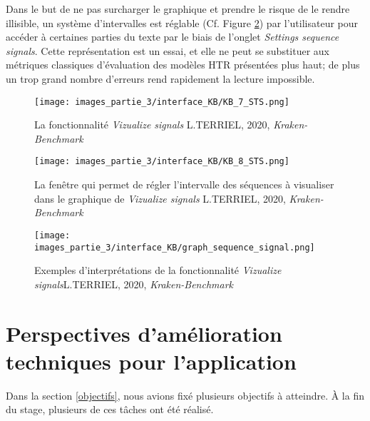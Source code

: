 Dans le but de ne pas surcharger le graphique et prendre le risque de le rendre illisible, un système d'intervalles est réglable (Cf. Figure \ref{fig:accueil_KB_6}) par l'utilisateur pour accéder à certaines parties du texte par le biais de l'onglet \textit{Settings sequence signals}. Cette représentation est un essai, et elle ne peut se substituer aux métriques classiques d'évaluation des modèles HTR présentées plus haut; de plus un trop grand nombre d'erreurs rend rapidement la lecture impossible.
\begin{figure}[H]
    \centering
    \texttt{[image: images\_partie\_3/interface\_KB/KB\_7\_STS.png]}
        \caption{La fonctionnalité \textit{Vizualize signals} \textcopyright L.TERRIEL, 2020, \textit{Kraken-Benchmark}}
        \label{fig:accueil_KB_5}
\end{figure}
\begin{figure}[H]
    \centering
    \texttt{[image: images\_partie\_3/interface\_KB/KB\_8\_STS.png]}
        \caption{La fenêtre  qui permet de régler l'intervalle des séquences à visualiser dans le graphique de \textit{Vizualize signals} \textcopyright L.TERRIEL, 2020, \textit{Kraken-Benchmark}}
        \label{fig:accueil_KB_6}
\end{figure}
\begin{figure}[H]
    \centering
    \texttt{[image: images\_partie\_3/interface\_KB/graph\_sequence\_signal.png]}
        \caption{Exemples d'interprétations de la fonctionnalité  \textit{Vizualize signals}\textcopyright L.TERRIEL, 2020, \textit{Kraken-Benchmark}}
        \label{fig:accueil_KB_7}
\end{figure}

\newpage
\section{Perspectives d'amélioration techniques pour l'application}\label{perspectives_amélios}

Dans la section \ref{objectifs}, nous avions fixé plusieurs objectifs à atteindre. À la fin du stage, plusieurs de ces tâches ont été réalisé. 

